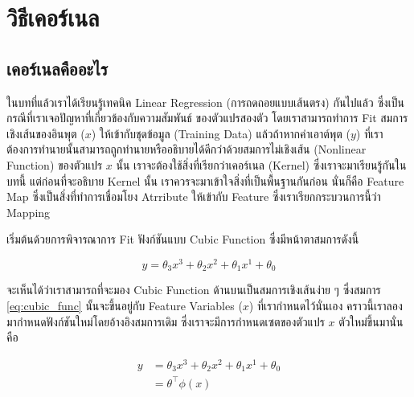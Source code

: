 

\chapter{วิธีเคอร์เนล}
\label{ch:kernel}

\section{เคอร์เนลคืออะไร}
\label{sec:kernel}

ในบทที่แล้วเราได้เรียนรู้เทคนิค Linear Regression (การถดถอยแบบเส้นตรง) กันไปแล้ว ซึ่งเป็นกรณีที่เราเจอปัญหาที่เกี่ยวข้องกับความสัมพันธ์%
ของตัวแปรสองตัว โดยเราสามารถทำการ Fit สมการเชิงเส้นของอินพุต ($x$) ให้เข้ากับชุดข้อมูล (Training Data) แล้วถ้าหากค่าเอาต์พุต 
($y$) ที่เราต้องการทำนายนั้นสามารถถูกทำนายหรืออธิบายได้ดีกว่าด้วยสมการไม่เชิงเส้น (Nonlinear Function) ของตัวแปร $x$ นั้น 
เราจะต้องใช้สิ่งที่เรียกว่าเคอร์เนล (Kernel) ซึ่งเราจะมาเรียนรู้กันในบทนี้ แต่ก่อนที่จะอธิบาย Kernel นั้น เราควรจะมาเข้าใจสิ่งที่เป็นพื้นฐานกันก่อน%
นั่นก็คือ Feature Map ซึ่งเป็นสิ่งที่ทำการเชื่อมโยง Atrribute ให้เข้ากับ Feature ซึ่งเราเรียกกระบวนการนี้ว่า Mapping 

เริ่มต้นด้วยการพิจารณาการ Fit ฟังก์ชันแบบ Cubic Function ซึ่งมีหน้าตาสมการดังนี้

\begin{equation}\label{eq:cubic_func}
    y = \theta_{3}x^{3} + \theta_{2}x^{2} + \theta_{1}x^{1} + \theta_{0}
\end{equation}

จะเห็นได้ว่าเราสามารถที่จะมอง Cubic Function ด้านบนเป็นสมการเชิงเส้นง่าย ๆ ซึ่งสมการ \ref{eq:cubic_func} นั้นจะขึ้นอยู่กับ Feature 
Variables ($x$) ที่เรากำหนดไว้นั่นเอง คราวนี้เราลองมากำหนดฟังก์ชันใหม่โดยอ้างอิงสมการเดิม ซึ่งเราจะมีการกำหนดเซตของตัวแปร $x$ 
ตัวใหม่ขึ้นมานั่นคือ

\begin{align}\label{eq:cubic_func_2}
    y &= \theta_{3}x^{3} + \theta_{2}x^{2} + \theta_{1}x^{1} + \theta_{0} \nonumber \\ 
      &= \theta^{\top}\phi(x)
\end{align}

